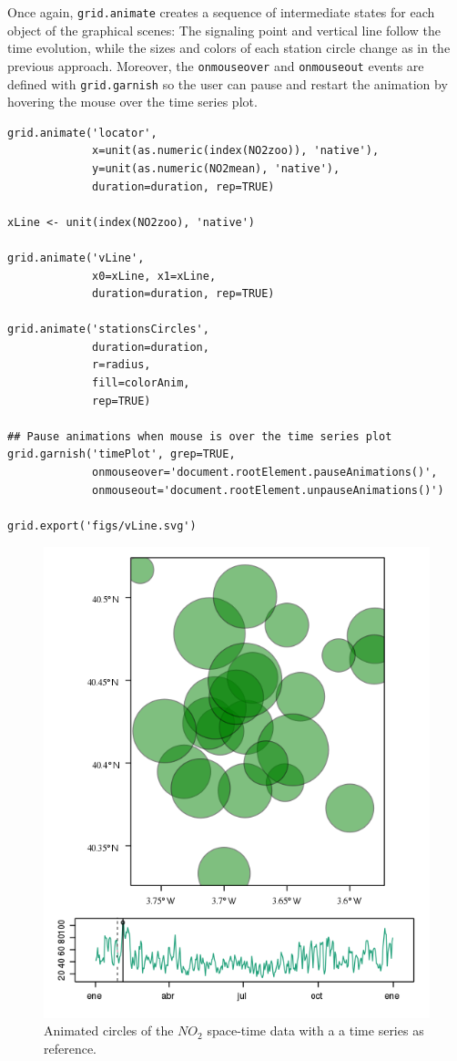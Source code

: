 \documentclass[smallroyalvopaper]{memoir}
\begin{document}
Once again, \texttt{grid.animate} creates a sequence of intermediate states
for each object of the graphical scenes: The signaling point and
vertical line follow the time evolution, while the sizes and colors of
each station circle change as in the previous approach.  Moreover, the
\texttt{onmouseover} and \texttt{onmouseout} events are defined with \texttt{grid.garnish}
so the user can pause and restart the animation by hovering the mouse
over the time series plot.
\lstset{language=R,numbers=none}
\begin{lstlisting}
grid.animate('locator',
             x=unit(as.numeric(index(NO2zoo)), 'native'),
             y=unit(as.numeric(NO2mean), 'native'),
             duration=duration, rep=TRUE)

xLine <- unit(index(NO2zoo), 'native')

grid.animate('vLine',
             x0=xLine, x1=xLine,
             duration=duration, rep=TRUE)

grid.animate('stationsCircles',
             duration=duration,
             r=radius,
             fill=colorAnim,
             rep=TRUE)

## Pause animations when mouse is over the time series plot
grid.garnish('timePlot', grep=TRUE,
             onmouseover='document.rootElement.pauseAnimations()',
             onmouseout='document.rootElement.unpauseAnimations()')

grid.export('figs/vLine.svg')
\end{lstlisting}


\begin{figure}
  \centering
  \includegraphics[width=\textwidth]{figs/vLine.png}
  \caption{Animated circles of the $NO_2$ space-time data with a a time series as reference.}
  \label{fig:vLine}
\end{figure}

\backmatter

\printbibliography

\clearpage

\printindex
\end{document}
